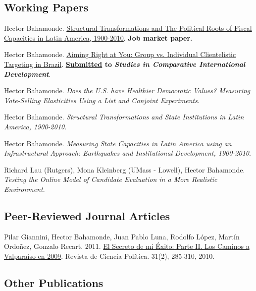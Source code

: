 \documentclass[letterpaper]{article}
\renewenvironment{itemize}{
  \begin{list}{}{
    \setlength{\leftmargin}{1.5em}
  }
}{
  \end{list}
}
\begin{document}
\subsection*{Working Papers}

\begin{itemize}
  \item Hector Bahamonde. \href{http://github.com/hbahamonde/IncomeTaxAdoption/raw/master/Bahamonde_IncomeTaxAdoption.pdf}{Structural Transformations and The Political Roots of Fiscal Capacities in Latin America, 1900-2010}. {\bf Job market paper}.
  \item Hector Bahamonde. \href{http://github.com/hbahamonde/Clientelism_paper/raw/master/Bahamonde_Clientelism_Paper.pdf}{Aiming Right at You: Group vs. Individual Clientelistic Targeting in Brazil}. {\bf \underline{Submitted} to \emph{Studies in Comparative International Development}}.
  \item Hector Bahamonde. \emph{Does the U.S. have Healthier Democratic Values? Measuring Vote-Selling Elasticities Using a List and Conjoint Experiments}.
  \item Hector Bahamonde. \emph{Structural Transformations and State Institutions in Latin America, 1900-2010}.
  \item Hector Bahamonde. \emph{Measuring State Capacities in Latin America using an Infrastructural Approach: Earthquakes and Institutional Development, 1900-2010}.
  \item Richard Lau (Rutgers), Mona Kleinberg (UMass - Lowell), Hector Bahamonde. \emph{Testing the Online Model of Candidate Evaluation in a More Realistic Environment}.
\end{itemize}


\subsection*{Peer-Reviewed Journal Articles}

\begin{itemize}
  \item Pilar Giannini, Hector Bahamonde, Juan Pablo Luna, Rodolfo L\'opez, Mart\'in Ordo\~nez, Gonzalo Recart. 2011. \href{http://www.revistacienciapolitica.cl/rcp/wp-content/uploads/2013/09/07_vol_31_2.pdf}{El Secreto de mi \'Exito: Parte II. Los Caminos a Valpara\'iso en 2009}. Revista de Ciencia Pol\'itica. 31(2), 285-310, 2010.
\end{itemize}


\subsection*{Other Publications}
\end{document}

